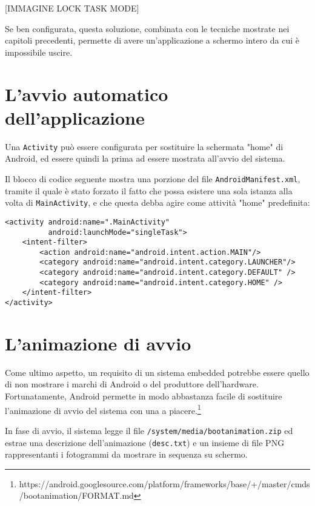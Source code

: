 [IMMAGINE LOCK TASK MODE]

Se ben configurata, questa soluzione, combinata con le tecniche mostrate nei capitoli precedenti, permette di avere un'applicazione a schermo intero da cui è impossibile uscire.

\section{L'avvio automatico dell'applicazione}
\label{sec:kiosk_launcher}

Una \texttt{Activity} può essere configurata per sostituire la schermata "home" di Android, ed essere quindi la prima ad essere mostrata all'avvio del sistema.

Il blocco di codice seguente mostra una porzione del file \texttt{AndroidManifest.xml}, tramite il quale è stato forzato il fatto che possa esistere una sola istanza alla volta di \texttt{MainActivity}, e che questa debba agire come attività "home" predefinita:

\begin{verbatim}
<activity android:name=".MainActivity"
          android:launchMode="singleTask">
    <intent-filter>
        <action android:name="android.intent.action.MAIN"/>
        <category android:name="android.intent.category.LAUNCHER"/>
        <category android:name="android.intent.category.DEFAULT" />
        <category android:name="android.intent.category.HOME" />
    </intent-filter>
</activity>
\end{verbatim}

\section{L'animazione di avvio}
\label{sec:kiosk_bootanimation}

Come ultimo aspetto, un requisito di un sistema embedded potrebbe essere quello di non mostrare i marchi di Android o del produttore dell'hardware. Fortunatamente, Android permette in modo abbastanza facile di sostituire l'animazione di avvio del sistema con una a piacere.\footnote{https://android.googlesource.com/platform/frameworks/base/+/master/cmds/bootanimation/FORMAT.md}

In fase di avvio, il sistema legge il file \texttt{/system/media/bootanimation.zip} ed estrae una descrizione dell'animazione (\texttt{desc.txt}) e un insieme di file PNG rappresentanti i fotogrammi da mostrare in sequenza su schermo.


